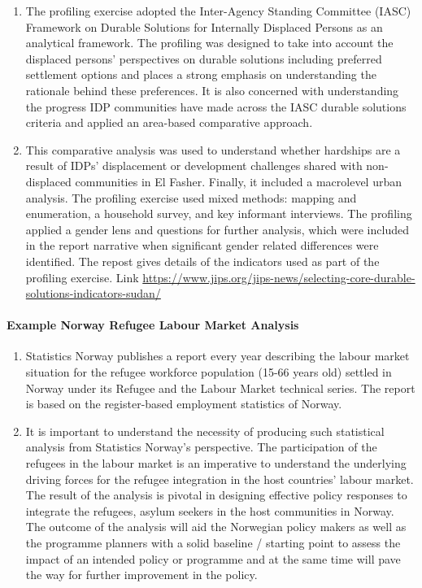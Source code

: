\documentclass[
]{article}
\begin{document}
\begin{enumerate}
\def\labelenumi{\arabic{enumi}.}
\setcounter{enumi}{446}
\item
  The profiling exercise adopted the Inter-Agency Standing Committee
  (IASC) Framework on Durable Solutions for Internally Displaced
  Persons as an analytical framework. The profiling was designed to
  take into account the displaced persons' perspectives on durable
  solutions including preferred settlement options and places a strong
  emphasis on understanding the rationale behind these preferences. It
  is also concerned with understanding the progress IDP communities
  have made across the IASC durable solutions criteria and applied an
  area-based comparative approach.
\item
  This comparative analysis was used to understand whether hardships
  are a result of IDPs' displacement or development challenges shared
  with non-displaced communities in El Fasher. Finally, it included a
  macrolevel urban analysis. The profiling exercise used mixed
  methods: mapping and enumeration, a household survey, and key
  informant interviews. The profiling applied a gender lens and
  questions for further analysis, which were included in the report
  narrative when significant gender related differences were
  identified. The repost gives details of the indicators used as part
  of the profiling exercise. Link
  \url{https://www.jips.org/jips-news/selecting-core-durable-solutions-indicators-sudan/}
\end{enumerate}

\hypertarget{example-norway-refugee-labour-market-analysis-1}{%
\paragraph{Example Norway Refugee Labour Market Analysis}\label{example-norway-refugee-labour-market-analysis-1}}

\begin{enumerate}
\def\labelenumi{\arabic{enumi}.}
\setcounter{enumi}{448}
\item
  Statistics Norway publishes a report every year describing the
  labour market situation for the refugee workforce population (15-66
  years old) settled in Norway under its Refugee and the Labour Market
  technical series. The report is based on the register-based
  employment statistics of Norway.
\item
  It is important to understand the necessity of producing such
  statistical analysis from Statistics Norway's perspective. The
  participation of the refugees in the labour market is an imperative
  to understand the underlying driving forces for the refugee
  integration in the host countries' labour market. The result of the
  analysis is pivotal in designing effective policy responses to
  integrate the refugees, asylum seekers in the host communities in
  Norway. The outcome of the analysis will aid the Norwegian policy
  makers as well as the programme planners with a solid baseline /
  starting point to assess the impact of an intended policy or
  programme and at the same time will pave the way for further
  improvement in the policy.
\end{enumerate}
\end{document}
